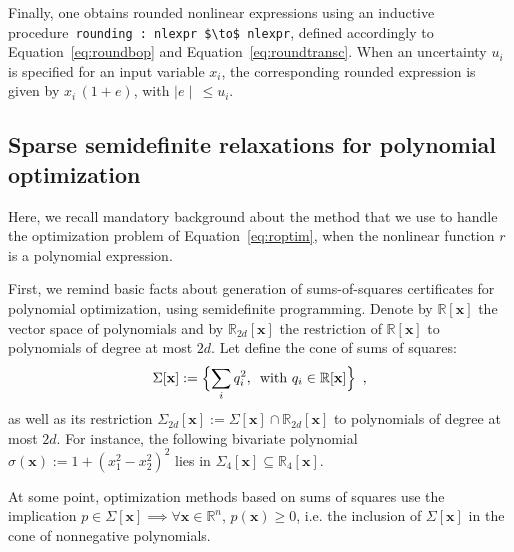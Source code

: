 \documentclass[a4paper,10pt]{article}
\newcommand{\R}{\mathbb{R}}
\newcommand{\x}{\mathbf{x}}
\theoremstyle{plain}
\theoremstyle{definition}
\theoremstyle{remark}
\begin{document}
Finally, one obtains rounded nonlinear expressions using an inductive procedure~\lstinline|rounding : nlexpr $\to$ nlexpr|, defined accordingly to Equation~\eqref{eq:roundbop} and Equation~\eqref{eq:roundtransc}. When an uncertainty $u_i$ is specified for an input variable $x_i$, the corresponding rounded expression is given by $x_i \, (1 + e)$, with $\mid e \mid \, \leq u_i$.

\subsection{Sparse semidefinite relaxations for polynomial optimization}
\label{sec:sdpbackground}
Here, we recall mandatory background about the method that we use to handle the optimization problem of Equation~\eqref{eq:roptim}, when the nonlinear function $r$ is a polynomial expression.

First, we remind basic facts about generation of sums-of-squares certificates for polynomial optimization, using semidefinite programming.
Denote by $\R[\x]$ the vector space of polynomials and by $\R_{2 d}[\x]$ the restriction of $\R[\x]$ to polynomials of degree at most $2 d$. Let define the cone of sums of squares:
\begin{equation}
\label{eq:cone_sos}
\Sigma[\x] := \Bigl\{\sum_i q_i^2, \, \text{ with } q_i \in \R[\x] \Bigr\}\enspace,
\end{equation}
%
as well as its restriction $\Sigma_{2 d}[\x] := \Sigma[\x] \cap \R_{2 d}[\x]$ to polynomials of degree at most $2 d$. For instance, the following bivariate polynomial  $\sigma (\x) := 1 + (x_1^2 - x_2^2)^2$ lies in $\Sigma_4[\x] \subseteq \R_4[\x]$.

At some point, optimization methods based on sums of squares use the implication $p \in \Sigma[\x] \implies \forall \x \in \R^n, \, p(\x) \geq 0$, i.e. the inclusion of $\Sigma[\x]$ in the cone of nonnegative polynomials.
\end{document}
